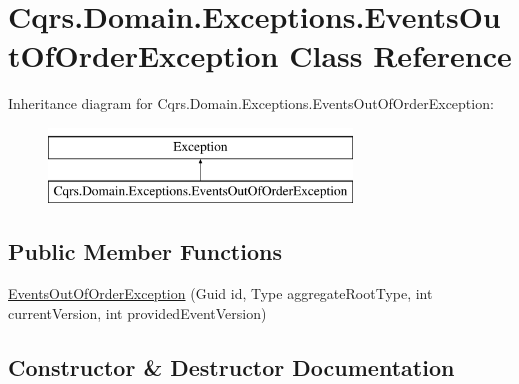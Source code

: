 \hypertarget{classCqrs_1_1Domain_1_1Exceptions_1_1EventsOutOfOrderException}{}\section{Cqrs.\+Domain.\+Exceptions.\+Events\+Out\+Of\+Order\+Exception Class Reference}
\label{classCqrs_1_1Domain_1_1Exceptions_1_1EventsOutOfOrderException}
Inheritance diagram for Cqrs.\+Domain.\+Exceptions.\+Events\+Out\+Of\+Order\+Exception\+:\begin{figure}[H]
\begin{center}
\leavevmode
\includegraphics[height=2.000000cm]{classCqrs_1_1Domain_1_1Exceptions_1_1EventsOutOfOrderException}
\end{center}
\end{figure}
\subsection*{Public Member Functions}
\begin{DoxyCompactItemize}
\item 
\hyperlink{classCqrs_1_1Domain_1_1Exceptions_1_1EventsOutOfOrderException_a9a310b697aa5f2bfaefd7511aca6e808}{Events\+Out\+Of\+Order\+Exception} (Guid id, Type aggregate\+Root\+Type, int current\+Version, int provided\+Event\+Version)
\end{DoxyCompactItemize}


\subsection{Constructor \& Destructor Documentation}
\mbox{\label{classCqrs_1_1Domain_1_1Exceptions_1_1EventsOutOfOrderException_a9a310b697aa5f2bfaefd7511aca6e808}} 
